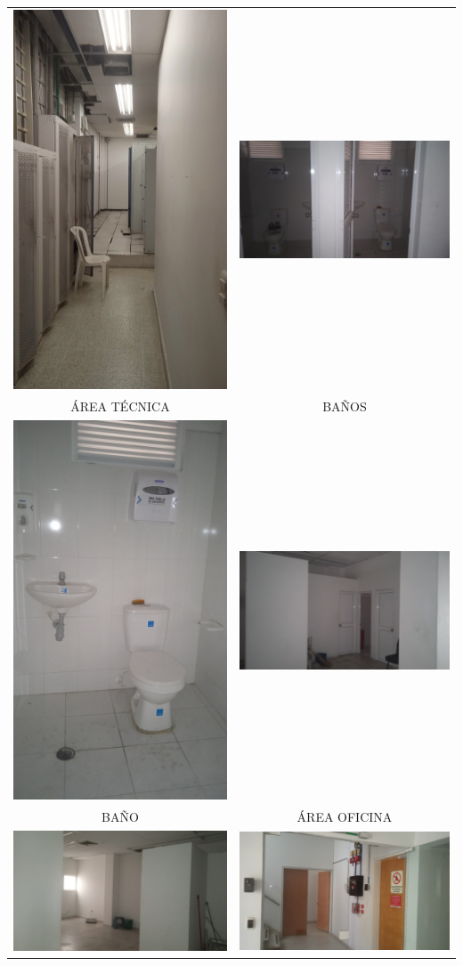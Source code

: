 \documentclass[12pt,a4paper,twoside]{article}
\begin{document}
{\begin{tabular}{ c c }
	\includegraphics[width = 3 cm]{Imagenes/9} & \includegraphics[width = 7 cm]{Imagenes/7} \\
	ÁREA TÉCNICA  & BAÑOS\\
	\includegraphics[width = 3 cm]{Imagenes/8} & \includegraphics[width = 7 cm]{Imagenes/12} \\
	BAÑO & ÁREA OFICINA \\
	\includegraphics[width = 7 cm]{Imagenes/13} & \includegraphics[width = 7 cm]{Imagenes/14} \\

\end{tabular}}
\end{document}
